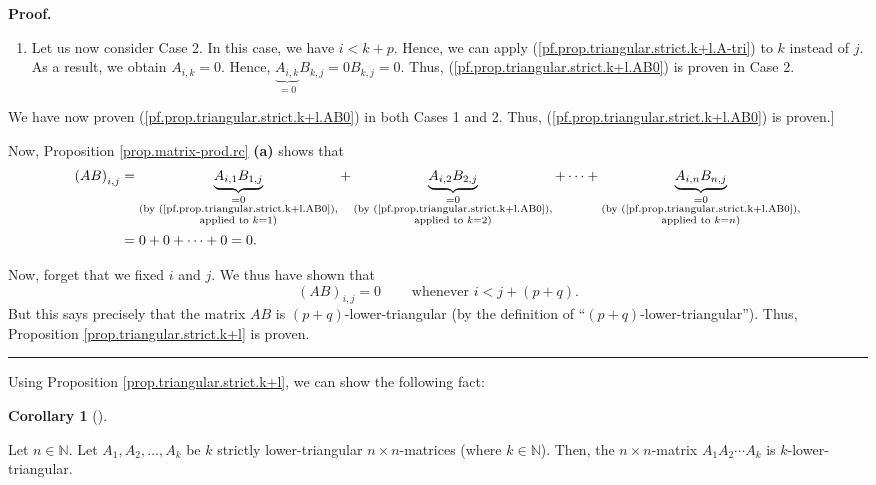 \documentclass[numbers=enddot,12pt,final,onecolumn,notitlepage]{scrartcl}%
\theoremstyle{definition}
\newtheorem{coro}[theo]{Corollary}
\newenvironment{corollary}[1][]
{\begin{coro}[#1]\begin{leftbar}}
{\end{leftbar}\end{coro}}
\newenvironment{proof}[1][Proof]{\noindent\textbf{#1.} }{\ \rule{0.5em}{0.5em}}
\begin{document}
\begin{proof}
\begin{enumerate}
\item Let us now consider Case 2. In this case, we have $i<k+p$. Hence, we can
apply (\ref{pf.prop.triangular.strict.k+l.A-tri}) to $k$ instead of $j$. As a
result, we obtain $A_{i,k}=0$. Hence, $\underbrace{A_{i,k}}_{=0}%
B_{k,j}=0B_{k,j}=0$. Thus, (\ref{pf.prop.triangular.strict.k+l.AB0}) is proven
in Case 2.
\end{enumerate}

We have now proven (\ref{pf.prop.triangular.strict.k+l.AB0}) in both Cases 1
and 2. Thus, (\ref{pf.prop.triangular.strict.k+l.AB0}) is proven.]

Now, Proposition \ref{prop.matrix-prod.rc} \textbf{(a)} shows that%
\begin{align*}
\left(  AB\right)  _{i,j}  &  =\underbrace{A_{i,1}B_{1,j}}%
_{\substack{=0\\\text{(by (\ref{pf.prop.triangular.strict.k+l.AB0}%
),}\\\text{applied to }k=1\text{)}}}+\underbrace{A_{i,2}B_{2,j}}%
_{\substack{=0\\\text{(by (\ref{pf.prop.triangular.strict.k+l.AB0}%
),}\\\text{applied to }k=2\text{)}}}+\cdots+\underbrace{A_{i,n}B_{n,j}%
}_{\substack{=0\\\text{(by (\ref{pf.prop.triangular.strict.k+l.AB0}%
),}\\\text{applied to }k=n\text{)}}}\\
&  =0+0+\cdots+0=0.
\end{align*}


Now, forget that we fixed $i$ and $j$. We thus have shown that%
\[
\left(  AB\right)  _{i,j}=0\ \ \ \ \ \ \ \ \ \ \text{whenever }i<j+\left(
p+q\right)  .
\]
But this says precisely that the matrix $AB$ is $\left(  p+q\right)
$-lower-triangular (by the definition of \textquotedblleft$\left(  p+q\right)
$-lower-triangular\textquotedblright). Thus, Proposition
\ref{prop.triangular.strict.k+l} is proven.
\end{proof}

Using Proposition \ref{prop.triangular.strict.k+l}, we can show the following fact:

\begin{corollary}
\label{cor.triangular.strict.kprod}Let $n\in\mathbb{N}$. Let $A_{1}%
,A_{2},\ldots,A_{k}$ be $k$ strictly lower-triangular $n\times n$-matrices
(where $k\in\mathbb{N}$). Then, the $n\times n$-matrix $A_{1}A_{2}\cdots
A_{k}$ is $k$-lower-triangular.
\end{corollary}
\end{document}

